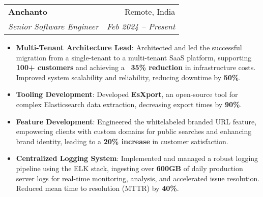 \documentclass[letterpaper,11pt]{article}
\makeatletter
\newcommand{\resumeItem}[2]{
  \item\small{
    \textbf{#1}{: #2 \vspace{-2pt}}
  }
}
\newcommand{\resumeSubheading}[4]{
  \vspace{-1pt}\item
    \begin{tabular*}{0.97\textwidth}[t]{l@{\extracolsep{\fill}}r}
      \textbf{#1} & #2 \\
      \textit{\small#3} & \textit{\small #4} \\
    \end{tabular*}\vspace{-5pt}
}
\newcommand{\resumeItemListStart}{\begin{itemize}}
\newcommand{\resumeItemListEnd}{\end{itemize}\vspace{-5pt}}
\makeatother
\begin{document}
  \resumeSubheading
    {Anchanto}{Remote, India}
    {Senior Software Engineer}{Feb 2024 -- Present}
    \resumeItemListStart
      \resumeItem{Multi-Tenant Architecture Lead}
        {Architected and led the successful migration from a single-tenant to a multi-tenant SaaS platform, supporting \textbf{100+ customers} and achieving a \textbf{~35\% reduction} in infrastructure
        costs. Improved system scalability and reliability, reducing downtime by \textbf{50\%}.}
      \resumeItem{Tooling Development}
        {Developed \textbf{EsXport}, an open-source tool for complex Elasticsearch data extraction, decreasing export times by \textbf{90\%}.}
      \resumeItem{Feature Development}
        {Engineered the whitelabeled branded URL feature, empowering clients with custom domains for public searches and enhancing brand identity, leading to a \textbf{20\% increase} in customer
        satisfaction.}
      \resumeItem{Centralized Logging System}
        {Implemented and managed a robust logging pipeline using the ELK stack, ingesting over \textbf{600GB} of daily production server logs for real-time monitoring, analysis, and accelerated issue
        resolution. Reduced mean time to resolution (MTTR) by \textbf{40\%}.}
    \resumeItemListEnd
\end{document}
